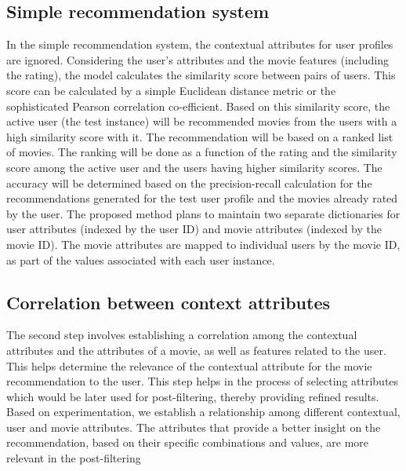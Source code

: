 \documentclass{article}
\begin{document}
\subsection{Simple recommendation system}
In the simple recommendation system, the contextual attributes for user profiles are ignored. Considering the user's attributes and the movie features (including the rating), the model calculates the similarity score between pairs of users. This score can be calculated by a simple Euclidean distance metric or the sophisticated Pearson correlation co-efficient. Based on this similarity score, the active user (the test instance) will be recommended movies from the users with a high similarity score with it. The recommendation will be based on a ranked list of movies. The ranking will be done as a function of the rating and the similarity score among the active user and the users having higher similarity scores. The accuracy will be determined based on the precision-recall calculation for the recommendations generated for the test user profile and the movies already rated by the user. 
The proposed method plans to maintain two separate dictionaries for user attributes (indexed by the user ID) and movie attributes (indexed by the movie ID). The movie attributes are mapped to individual users by the movie ID, as part of the values associated with each user instance.

\subsection{Correlation between context attributes}
The second step involves establishing a correlation among the contextual attributes and the attributes of a movie, as well as features related to the user. This helps determine the relevance of the contextual attribute for the movie recommendation to the user. This step helps in the process of selecting attributes which would be later used for post-filtering, thereby providing refined results. Based on experimentation, we establish a relationship among different contextual, user and movie attributes. The attributes that provide a better insight on the recommendation, based on their specific combinations and values, are more relevant in the post-filtering 
\end{document}
